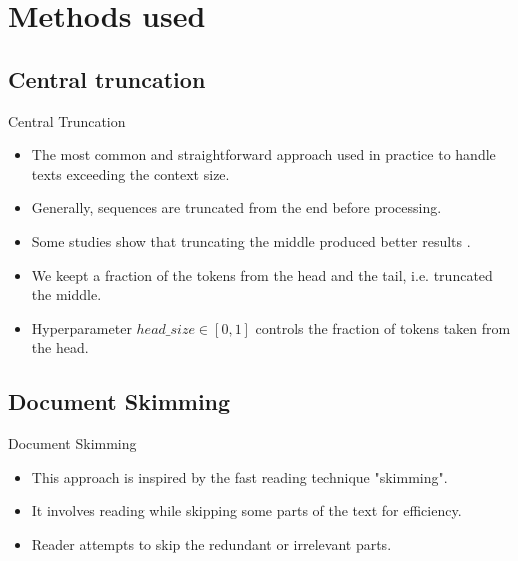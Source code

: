 \section{Methods used}


\subsection{Central truncation}

\begin{frame}{Central Truncation}

	\begin{itemize}
		\item The most common and straightforward approach used in practice to handle
		texts exceeding the context size.
		\item Generally, sequences are truncated from the end before processing.
		\item Some studies show that truncating the middle produced better results
		\citep{sun2019fine, worsham-kalita-2018-genre}.
		\item We keept a fraction of the tokens from the head and the tail, i.e. truncated
		the middle.
		\item Hyperparameter $head\_size \in [0, 1]$ controls the fraction of tokens taken
		from the head.
	\end{itemize}



\subsection{Document Skimming}

\begin{frame}{Document Skimming}

	\begin{itemize}
		\item This approach is inspired by the fast reading technique "skimming".
		\item<2-> It involves reading while skipping some parts of the text for efficiency.
		\item<3> Reader attempts to skip the redundant or irrelevant parts.
	\end{itemize}


\end{frame}
\end{frame}

